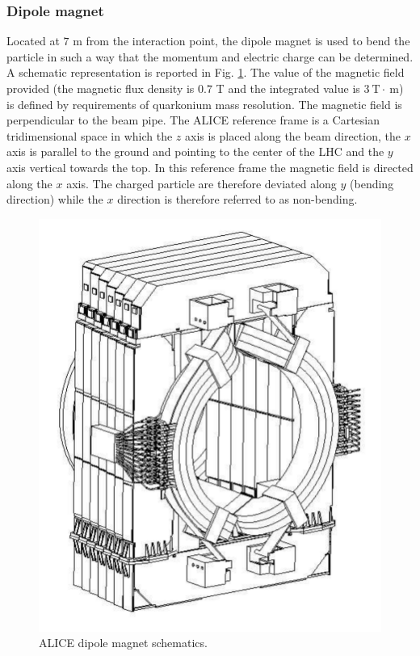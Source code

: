 \subsubsection{Dipole magnet}
Located at $7$ m from the interaction point, the dipole magnet is used to bend the particle in such a way that the momentum and electric charge can be determined.
A schematic representation is reported in Fig. \ref{fig:dipole}.
The value of the magnetic field provided (the magnetic flux density is $0.7$ T and the integrated value is $3\ \mathrm{T\cdot~m}$) is defined by requirements of quarkonium mass resolution.
The magnetic field is perpendicular to the beam pipe.
The ALICE reference frame is a Cartesian tridimensional space in which the $z$ axis is placed along the beam direction, the $x$ axis is parallel to the ground and pointing to the center of the LHC and the $y$ axis vertical towards the top.
In this reference frame the magnetic field is directed along the $x$ axis. The charged particle are therefore deviated along $y$ (bending direction) while the $x$ direction is therefore referred to as non-bending.

\begin{figure}[!h]
\begin{center}
\includegraphics[width=0.6\linewidth]{Chapters/Introduction/Figs/dipole.pdf}
\caption{ALICE dipole magnet schematics.}
\label{fig:dipole}
\end{center}
\end{figure}

